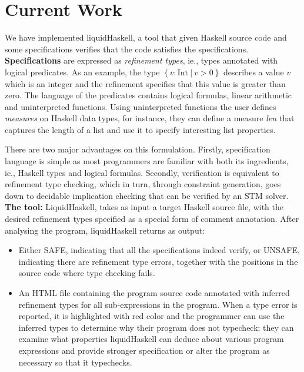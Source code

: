 \section*{Current Work}
We have implemented liquidHaskell, a tool that given Haskell source code 
and some specifications 
verifies that the code
satisfies the specifications.\\

\textbf{Specifications}
are expressed as \textit{refinement types}, ie., types annotated with logical predicates.
As an example, the type $\left\lbrace v : \text{Int}\ |\ v > 0 \right\rbrace $ 
describes a value $v$ which is an integer 
and the refinement specifies that this value is greater than zero.
%
The language of the predicates contains logical formulas, linear arithmetic and uninterpreted functions. 
%
Using uninterpreted functions the user defines \textit{measures} on Haskell data types, 
for instance, they can define a measure \textit{len} that captures the length of a list 
and use it to specify interesting list properties.

There are two major advantages on this formulation.
%
Firstly, specification language is simple
as most programmers are familiar with both
its ingredients, ie., Haskell types and logical formulas.
%
Secondly, verification is equivalent to refinement type checking,
which in turn, through constraint generation, goes down to 
decidable implication checking
that can be verified by an STM solver.
\\

\textbf{The tool:}
LiquidHaskell, takes as input
a target Haskell source file, with the desired refinement types specified as a special
form of comment annotation.
%
After analysing the program, liquidHaskell returns as output:

\begin{itemize}
\item
Either SAFE, indicating that all the specifications indeed verify, 
or UNSAFE, indicating there are refinement type errors, together with the positions in the source
code where type checking fails.
\item
An HTML file containing the program source code annotated with inferred refinement types for all sub-expressions in the program. 
When a type error is reported, it is highlighted with red color and the programmer can use the inferred
types to determine why their program does not typecheck: they can examine what
properties liquidHaskell can deduce about various program expressions and 
provide stronger specification or alter the program as necessary so that it typechecks.
\end{itemize}


